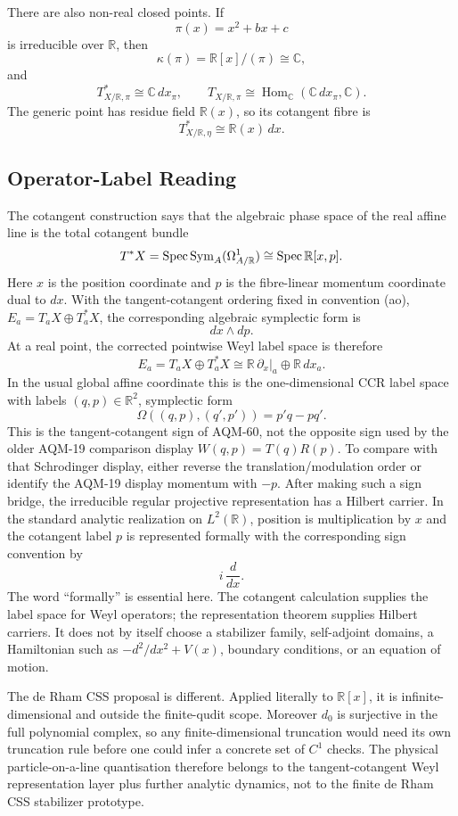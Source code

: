 There are also non-real closed points.  If
\[
  \pi(x)=x^2+b x+c
\]
is irreducible over \(\mathbb R\), then
\[
  \kappa(\pi)=\mathbb R[x]/(\pi)\cong\mathbb C,
\]
and
\[
  T^*_{X/\mathbb R,\pi}\cong \mathbb C\,dx_\pi,\qquad
  T_{X/\mathbb R,\pi}\cong \operatorname{Hom}_{\mathbb C}(\mathbb C\,dx_\pi,
  \mathbb C).
\]
The generic point has residue field \(\mathbb R(x)\), so its cotangent fibre is
\[
  T^*_{X/\mathbb R,\eta}\cong\mathbb R(x)\,dx.
\]
\subsection{Operator-Label Reading}
The cotangent construction says that the algebraic phase space of the real
affine line is the total cotangent bundle
\[
  T^*X=\operatorname{Spec}\operatorname{Sym}_A(\Omega^1_{A/\mathbb R})
  \cong \operatorname{Spec}\mathbb R[x,p].
\]
Here \(x\) is the position coordinate and \(p\) is the fibre-linear momentum
coordinate dual to \(dx\).  With the tangent-cotangent ordering fixed in
convention (ao), \(E_a=T_aX\oplus T_a^*X\), the corresponding algebraic
symplectic form is
\[
  dx\wedge dp.
\]
At a real point, the corrected pointwise Weyl label space is therefore
\[
  E_a=T_aX\oplus T_a^*X\cong\mathbb R\,\partial_x|_a\oplus\mathbb R\,dx_a.
\]
In the usual global affine coordinate this is the one-dimensional CCR label
space with labels \((q,p)\in\mathbb R^2\), symplectic form
\[
  \Omega((q,p),(q',p'))=p' q-p q'.
\]
This is the tangent-cotangent sign of AQM-60, not the opposite sign used by the
older AQM-19 comparison display \(W(q,p)=T(q)R(p)\).  To compare with that
Schrodinger display, either reverse the translation/modulation order or identify
the AQM-19 display momentum with \(-p\).  After making such a sign bridge, the
irreducible regular projective representation has a Hilbert carrier.  In the
standard analytic realization on \(L^2(\mathbb R)\), position is multiplication
by \(x\) and the cotangent label \(p\) is represented formally with the
corresponding sign convention by
\[
  i\,\frac{d}{dx}.
\]
The word ``formally'' is essential here.  The cotangent calculation supplies
the label space for Weyl operators; the representation theorem supplies Hilbert
carriers.  It does not by itself choose a stabilizer family, self-adjoint
domains, a Hamiltonian such as \(-d^2/dx^2+V(x)\), boundary conditions, or an
equation of motion.

The de Rham CSS proposal is different.  Applied literally to \(\mathbb R[x]\),
it is infinite-dimensional and outside the finite-qudit scope.  Moreover
\(d_0\) is surjective in the full polynomial complex, so any finite-dimensional
truncation would need its own truncation rule before one could infer a concrete
set of \(C^1\) checks.  The physical particle-on-a-line quantisation therefore
belongs to the
tangent-cotangent Weyl representation layer plus further analytic dynamics,
not to the finite de Rham CSS stabilizer prototype.

